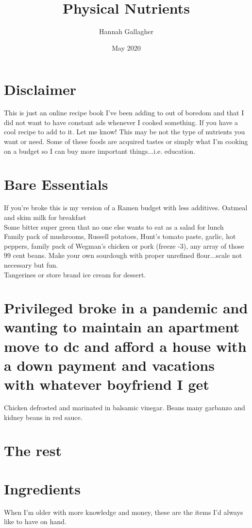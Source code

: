 \documentclass{article}
\title{Physical Nutrients}
\author{Hannah Gallagher}
\date{May 2020}
\begin{document}
\maketitle
\section*{Disclaimer}
This is just an online recipe book I've been adding to out of boredom and that I did not want to have constant ads whenever I cooked something. If you have a cool recipe to add to it. Let me know! This may be not the type of nutrients you want or need. Some of these foods are acquired tastes or simply what I'm cooking on a budget so I can buy more important things...i.e. education.  
\section*{Bare Essentials}
If you're broke this is my version of a Ramen budget with less additives. 
Oatmeal and skim milk for breakfast \\ 
Some bitter super green that no one else wants to eat as a salad for lunch \\ 
Family pack of mushrooms, Russell potatoes, Hunt's tomato paste, garlic, hot peppers, family pack of Wegman's chicken or pork (freeze -3), any array of those 99 cent beans. Make your own sourdough with proper unrefined flour...scale not necessary but fun.\\ 
Tangerines or store brand ice cream for dessert. 
\section*{Privileged broke in a pandemic and wanting to maintain an apartment move to dc and afford a house with a down payment and vacations with whatever boyfriend I get}

Chicken defrosted and marinated in balsamic vinegar.
Beans many garbanzo and kidney beans in red sauce. 

\section*{The rest}

\section*{Ingredients}
When I'm older with more knowledge and money, these are the items I'd always like to have on hand.
\end{document}
